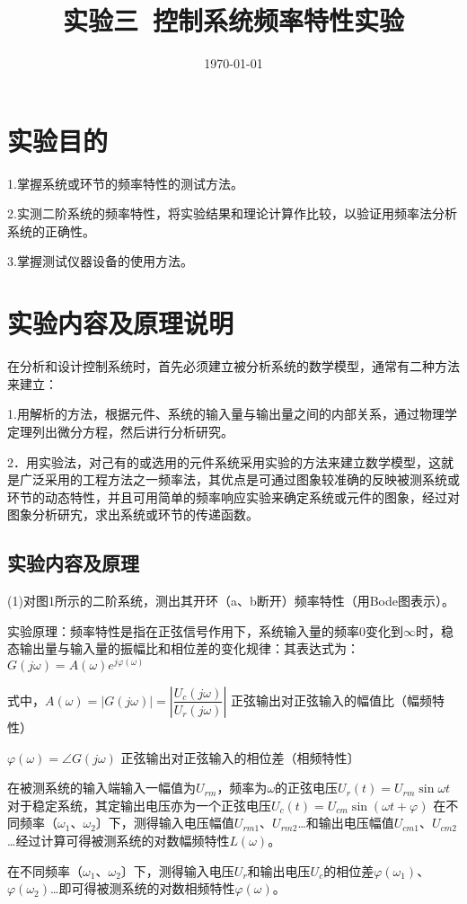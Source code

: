 \documentclass[UTF8,a4paper,10pt]{ctexart}
\title{\textbf{实验三\ 控制系统频率特性实验}}
\author{}
\date{\today}
\begin{document}
	\maketitle
	\section{实验目的}
	1.掌握系统或环节的频率特性的测试方法。
	
	2.实测二阶系统的频率特性，将实验结果和理论计算作比较，以验证用频率法分析系统的正确性。
	
	3.掌握测试仪器设备的使用方法。
	\section{实验内容及原理说明}
	在分析和设计控制系统时，首先必须建立被分析系统的数学模型，通常有二种方法来建立：
	
	1.用解析的方法，根据元件、系统的输入量与输出量之间的内部关系，通过物理学定理列出微分方程，然后讲行分析研究。
	
	2．用实验法，对己有的或选用的元件系统采用实验的方法来建立数学模型，这就是广泛采用的工程方法之一频率法，其优点是可通过图象较准确的反映被测系统或环节的动态特性，并且可用简单的频率响应实验来确定系统或元件的图象，经过对图象分析研宄，求出系统或环节的传递函数。
	\subsection{实验内容及原理}
	(1)对图1所示的二阶系统，测出其开环（a、b断开）频率特性（用Bode图表示）。
	
	实验原理：频率特性是指在正弦信号作用下，系统输入量的频率0变化到$\infty$时，稳态输出量与输入量的振幅比和相位差的变化规律：其表达式为：$G(j\omega)=A(\omega)e^{j\varphi(\omega)}$
	
	式中，$A(\omega)=\left|G(j\omega)\right|=\left|\dfrac{U_{c}(j\omega)}{U_{r}(j\omega)}\right|$ 
	正弦输出对正弦输入的幅值比（幅频特性）
	
	$\varphi(\omega)=\angle G(j\omega)$ 正弦输出对正弦输入的相位差（相频特性〕
	
	在被测系统的输入端输入一幅值为$U_{rm}$，频率为$\omega$的正弦电压$U_{r}(t)=U_{rm}\sin\omega t$
	对于稳定系统，其定输出电压亦为一个正弦电压$U_{c}(t)=U_{cm}\sin(\omega t+\varphi)$
	在不同频率（$\omega_{1}、\omega_{2}$〕下，测得输入电压幅值$U_{rm1}$、$U_{rm2}$…和输出电压幅值$U_{cm1}$、$U_{cm2}$…经过计算可得被测系统的对数幅频特性$L(\omega)$。
	
	在不同频率（$\omega_{1}、\omega_{2}$〕下，测得输入电压$U_{r}$和输出电压$U_{c}$的相位差$\varphi(\omega_{1})$、$\varphi(\omega_{2})$…即可得被测系统的对数相频特性$\varphi(\omega)$。
	
\end{document}
